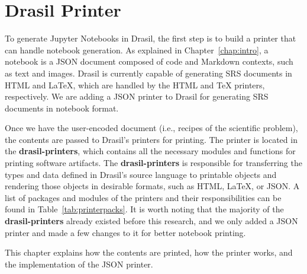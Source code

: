 \chapter{Drasil Printer} \label{chap:nbprinter}
To generate Jupyter Notebooks in Drasil, the first step is to build a printer 
that can handle notebook generation. As explained in Chapter~\ref{chap:intro}, 
a notebook is a JSON document composed of code and Markdown contexts, such as 
text and images. Drasil is currently capable of generating SRS documents in 
HTML and LaTeX, which are handled by the HTML and TeX printers, respectively. 
We are adding a JSON printer to Drasil for generating SRS documents in notebook 
format.

Once we have the user-encoded document (i.e., recipes of the scientific 
problem), the contents are passed to Drasil's printers for printing. 
The printer is located in the \textbf{drasil-printers}, which contains all the 
necessary modules and functions for printing software artifacts. The 
\textbf{drasil-printers} is responsible for transferring the types and data
defined in Drasil's source language to printable objects and rendering those 
objects in desirable formats, such as HTML, LaTeX, or JSON. A list of packages 
and modules of the printers and their responsibilities can be found in 
Table~\ref{tab:printerpacks}. It is worth noting that the majority of the
\textbf{drasil-printers} already existed before this research, and we only 
added a JSON printer and made a few changes to it for better notebook printing.

This chapter explains how the contents are printed, how the printer works, and 
the implementation of the JSON printer.

